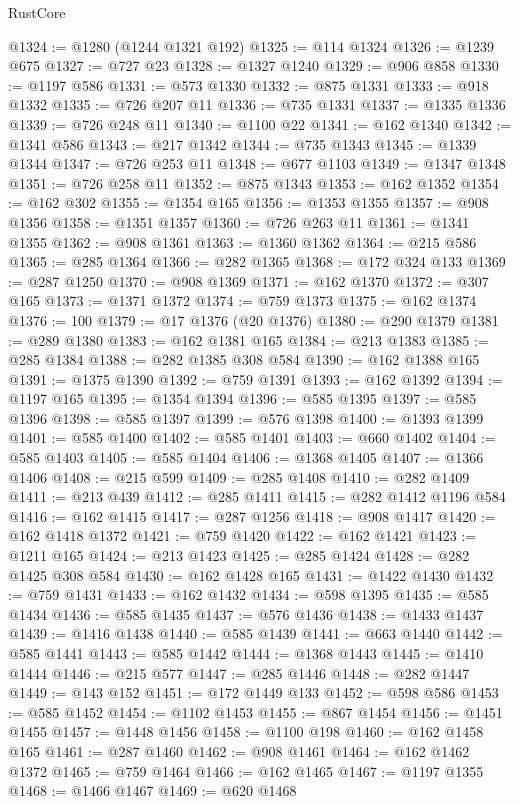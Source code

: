 \begin{lexlean}{RustCore}
\begin{coremodule}
@1324 := @1280 (@1244 @1321 @192)
@1325 := @114 @1324
@1326 := @1239 @675
@1327 := @727 @23
@1328 := @1327 @1240
@1329 := @906 @858
@1330 := @1197 @586
@1331 := @573 @1330
@1332 := @875 @1331
@1333 := @918 @1332
@1335 := @726 @207 @11
@1336 := @735 @1331
@1337 := @1335 @1336
@1339 := @726 @248 @11
@1340 := @1100 @22
@1341 := @162 @1340
@1342 := @1341 @586
@1343 := @217 @1342
@1344 := @735 @1343
@1345 := @1339 @1344
@1347 := @726 @253 @11
@1348 := @677 @1103
@1349 := @1347 @1348
@1351 := @726 @258 @11
@1352 := @875 @1343
@1353 := @162 @1352
@1354 := @162 @302
@1355 := @1354 @165
@1356 := @1353 @1355
@1357 := @908 @1356
@1358 := @1351 @1357
@1360 := @726 @263 @11
@1361 := @1341 @1355
@1362 := @908 @1361
@1363 := @1360 @1362
@1364 := @215 @586
@1365 := @285 @1364
@1366 := @282 @1365
@1368 := @172 @324 @133
@1369 := @287 @1250
@1370 := @908 @1369
@1371 := @162 @1370
@1372 := @307 @165
@1373 := @1371 @1372
@1374 := @759 @1373
@1375 := @162 @1374
@1376 := 100
@1379 := @17 @1376 (@20 @1376)
@1380 := @290 @1379
@1381 := @289 @1380
@1383 := @162 @1381 @165
@1384 := @213 @1383
@1385 := @285 @1384
@1388 := @282 @1385 @308 @584
@1390 := @162 @1388 @165
@1391 := @1375 @1390
@1392 := @759 @1391
@1393 := @162 @1392
@1394 := @1197 @165
@1395 := @1354 @1394
@1396 := @585 @1395
@1397 := @585 @1396
@1398 := @585 @1397
@1399 := @576 @1398
@1400 := @1393 @1399
@1401 := @585 @1400
@1402 := @585 @1401
@1403 := @660 @1402
@1404 := @585 @1403
@1405 := @585 @1404
@1406 := @1368 @1405
@1407 := @1366 @1406
@1408 := @215 @599
@1409 := @285 @1408
@1410 := @282 @1409
@1411 := @213 @439
@1412 := @285 @1411
@1415 := @282 @1412 @1196 @584
@1416 := @162 @1415
@1417 := @287 @1256
@1418 := @908 @1417
@1420 := @162 @1418 @1372
@1421 := @759 @1420
@1422 := @162 @1421
@1423 := @1211 @165
@1424 := @213 @1423
@1425 := @285 @1424
@1428 := @282 @1425 @308 @584
@1430 := @162 @1428 @165
@1431 := @1422 @1430
@1432 := @759 @1431
@1433 := @162 @1432
@1434 := @598 @1395
@1435 := @585 @1434
@1436 := @585 @1435
@1437 := @576 @1436
@1438 := @1433 @1437
@1439 := @1416 @1438
@1440 := @585 @1439
@1441 := @663 @1440
@1442 := @585 @1441
@1443 := @585 @1442
@1444 := @1368 @1443
@1445 := @1410 @1444
@1446 := @215 @577
@1447 := @285 @1446
@1448 := @282 @1447
@1449 := @143 @152
@1451 := @172 @1449 @133
@1452 := @598 @586
@1453 := @585 @1452
@1454 := @1102 @1453
@1455 := @867 @1454
@1456 := @1451 @1455
@1457 := @1448 @1456
@1458 := @1100 @198
@1460 := @162 @1458 @165
@1461 := @287 @1460
@1462 := @908 @1461
@1464 := @162 @1462 @1372
@1465 := @759 @1464
@1466 := @162 @1465
@1467 := @1197 @1355
@1468 := @1466 @1467
@1469 := @620 @1468

\end{coremodule}
\end{lexlean}
